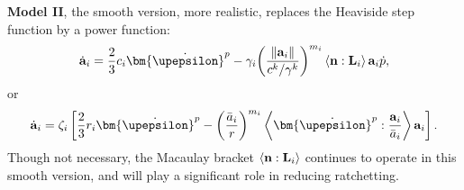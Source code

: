 \textbf{Model II}, the smooth version, more realistic, replaces the Heaviside step function by a power function:
\begin{equation}
{{\dot{\bf a}}_i} = \frac{2}{3}{c_i}{{\bm{\dot \upepsilon }}^p} - {\gamma _i}{\left( {\frac{{\left\| {{{\bf{a}}_i}} \right\|}}{{{c^k}/{\gamma ^k}}}} \right)^{{m_i}}}\left\langle {{\bf{n}}:{{\bf{L}}_i}} \right\rangle {{\bf{a}}_i}\dot p,
\end{equation}
or
\begin{equation}
{{\dot{\bf a}}_i} = {\zeta _i}\left[ {\frac{2}{3}{r_i}{{{\bm{\dot \upepsilon }}}^p} - {{\left( {\frac{{{{\bar a}_i}}}{r}} \right)}^{{m_i}}}\left\langle {{{{\bm{\dot \upepsilon }}}^p}:\frac{{{{\bf{a}}_i}}}{{{{\bar a}_i}}}} \right\rangle {{\bf{a}}_i}} \right].
\end{equation}
Though not necessary, the Macaulay bracket $\left\langle {{\bf{n}}:{{\bf{L}}_i}} \right\rangle$ continues to operate in this smooth version, and will play a significant role in reducing ratchetting.

